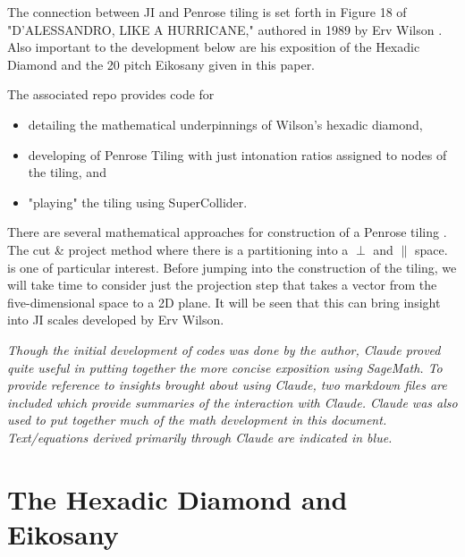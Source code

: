 \documentclass[11pt]{article}
\begin{document}
The connection between JI and Penrose tiling is set forth in Figure 18 of  "D'ALESSANDRO, LIKE A HURRICANE," authored in 1989 by Erv Wilson \cite{wilson1989} .  Also important to the development below are his exposition of the Hexadic Diamond and the 20 pitch Eikosany given in this paper.

The associated repo provides code for 
\begin{itemize}
\item detailing the mathematical underpinnings of Wilson's hexadic diamond, 
\item developing of Penrose Tiling with just intonation ratios assigned to nodes of the tiling, and
\item "playing" the tiling using SuperCollider.
\end{itemize}

There are several mathematical approaches for construction of a Penrose tiling  \cite{senechal1995,boyleSteinhardt2022}. The cut \& project method where there is a partitioning into a $\perp$ and $\parallel$ space. is one of particular interest.  Before jumping into the construction of the tiling, we will take time to consider just the projection step that takes a vector from the five-dimensional space to a 2D plane.  It will be seen that this can bring insight into JI scales developed by Erv Wilson.

\textit{Though the initial development of codes was done by the author, Claude proved quite useful in putting together the more concise exposition using SageMath. To provide reference to insights brought about using Claude, two markdown files are included which provide summaries of the interaction with Claude.  Claude was also used to put together much of the math development in this document. Text/equations derived primarily through Claude are indicated in \color{blue}blue\color{black}.}


\section{The Hexadic Diamond and Eikosany}
\end{document}
